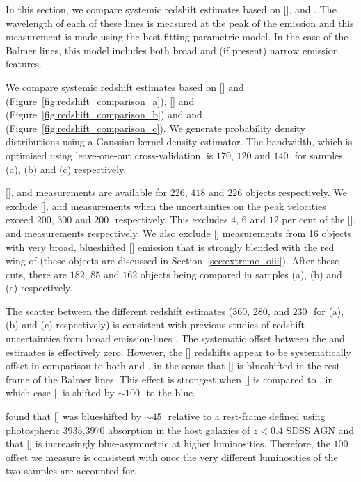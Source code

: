 In this section, we compare systemic redshift estimates based on [], \hb and \hans. 
The wavelength of each of these lines is measured at the peak of the emission and this measurement is made using the best-fitting parametric model. 
In the case of the Balmer lines, this model includes both broad and (if present) narrow emission features. 

We compare systemic redshift estimates based on [] and \hb (Figure~\ref{fig:redshift_comparison_a}), [] and \ha (Figure~\ref{fig:redshift_comparison_b}) and \hb and \ha (Figure~\ref{fig:redshift_comparison_c}). 
We generate probability density distributions using a Gaussian kernel density estimator.
The bandwidth, which is optimised using leave-one-out cross-validation, is $170$, $120$ and $140$\,\kms\, for samples (a), (b) and (c) respectively. 

[], \hb and \ha measurements are available for $226$, $418$ and $226$ objects respectively. 
We exclude [], \hb and \ha measurements when the uncertainties on the peak velocities exceed $200$, $300$ and $200$\,\kms\, respectively. 
This excludes $4$, $6$ and $12$ per cent of the [], \hb and \ha measurements respectively. 
We also exclude [] measurements from 16 objects with very broad, blueshifted [] emission that is strongly blended with the red wing of \hb (these objects are discussed in Section~\ref{sec:extreme_oiii}).
After these cuts, there are $182$, $85$ and $162$ objects being compared in samples (a), (b) and (c) respectively. 

The scatter between the different redshift estimates ($360$, $280$, and $230$\,\kms\, for (a), (b) and (c) respectively) is consistent with previous studies of redshift uncertainties from broad emission-lines \citep[e.g.][]{shen16b}. 
The systematic offset between the \ha and \hb estimates is effectively zero. 
However, the [] redshifts appear to be systematically offset in comparison to both \ha and \hbns, in the sense that [] is blueshifted in the rest-frame of the Balmer lines. 
This effect is strongest when [] is compared to \hbns, in which case [] is shifted by $\sim100$\,\kms\, to the blue.

\citet{hewett10} found that [] was blueshifted by $\sim45$\,\kms\, relative to a rest-frame defined using photospheric \ll$3935$,$3970$ absorption in the host galaxies of $z<0.4$ SDSS AGN and that [] is increasingly blue-asymmetric at higher luminosities. 
Therefore, the $100$\,\kms offset we measure is consistent with \citet{hewett10} once the very different luminosities of the two samples are accounted for. 

